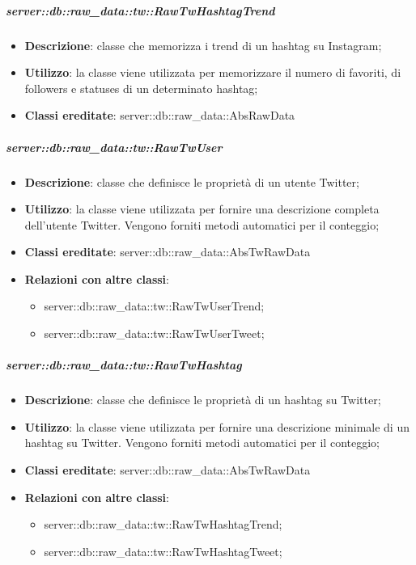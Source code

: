 		\subparagraph{server::db::raw\_data::tw::RawTwHashtagTrend} %
		\label{subp:server_db_raw_data_tw_rawighashtagtrend}
			\begin{itemize}
				\item \textbf{Descrizione}: classe che memorizza i trend di un hashtag su Instagram;
				\item \textbf{Utilizzo}: la classe viene utilizzata per memorizzare il numero di favoriti, di followers e statuses di un determinato hashtag;
				\item \textbf{Classi ereditate}: server::db::raw\_data::AbsRawData
			\end{itemize}


		\subparagraph{server::db::raw\_data::tw::RawTwUser} %
		\label{subp:server_db_raw_data_tw_rawtwuser}
			\begin{itemize}
				\item \textbf{Descrizione}: classe che definisce le proprietà di un utente Twitter;
				\item \textbf{Utilizzo}: la classe viene utilizzata per fornire una descrizione completa dell'utente Twitter. Vengono forniti metodi automatici per il conteggio;
				\item \textbf{Classi ereditate}: server::db::raw\_data::AbsTwRawData
				\item \textbf{Relazioni con altre classi}:
					\begin{itemize}
						\item server::db::raw\_data::tw::RawTwUserTrend;
						\item server::db::raw\_data::tw::RawTwUserTweet;
					\end{itemize}
			\end{itemize}


		\subparagraph{server::db::raw\_data::tw::RawTwHashtag} %
		\label{subp:server_db_raw_data_tw_rawtwhashtag}
			\begin{itemize}
				\item \textbf{Descrizione}: classe che definisce le proprietà di un hashtag su Twitter;
				\item \textbf{Utilizzo}: la classe viene utilizzata per fornire una descrizione minimale di un hashtag su Twitter. Vengono forniti metodi automatici per il conteggio;
				\item \textbf{Classi ereditate}: server::db::raw\_data::AbsTwRawData
				\item \textbf{Relazioni con altre classi}:
					\begin{itemize}
						\item server::db::raw\_data::tw::RawTwHashtagTrend;
						\item server::db::raw\_data::tw::RawTwHashtagTweet;
					\end{itemize}
			\end{itemize}


